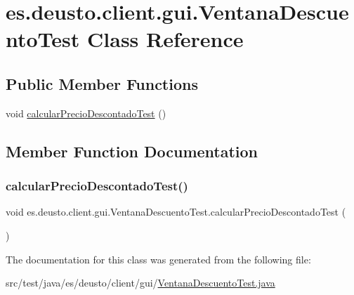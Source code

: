 \hypertarget{classes_1_1deusto_1_1client_1_1gui_1_1_ventana_descuento_test}{}\section{es.\+deusto.\+client.\+gui.\+Ventana\+Descuento\+Test Class Reference}
\label{classes_1_1deusto_1_1client_1_1gui_1_1_ventana_descuento_test}
\subsection*{Public Member Functions}
\begin{DoxyCompactItemize}
\item 
void \mbox{\hyperlink{classes_1_1deusto_1_1client_1_1gui_1_1_ventana_descuento_test_a6abe03976edd37682a44612a69c54ab4}{calcular\+Precio\+Descontado\+Test}} ()
\end{DoxyCompactItemize}


\subsection{Member Function Documentation}
\mbox{\label{classes_1_1deusto_1_1client_1_1gui_1_1_ventana_descuento_test_a6abe03976edd37682a44612a69c54ab4}} 
\subsubsection{\texorpdfstring{calcularPrecioDescontadoTest()}{calcularPrecioDescontadoTest()}}
{\footnotesize\ttfamily void es.\+deusto.\+client.\+gui.\+Ventana\+Descuento\+Test.\+calcular\+Precio\+Descontado\+Test (\begin{DoxyParamCaption}{ }\end{DoxyParamCaption})}



The documentation for this class was generated from the following file\+:\begin{DoxyCompactItemize}
\item 
src/test/java/es/deusto/client/gui/\mbox{\hyperlink{_ventana_descuento_test_8java}{Ventana\+Descuento\+Test.\+java}}\end{DoxyCompactItemize}
